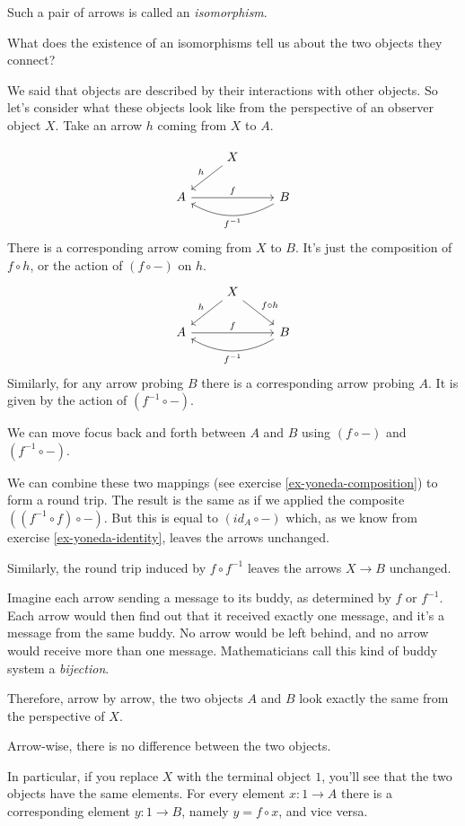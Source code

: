 \documentclass[DaoFP]{subfiles}
\begin{document}
Such a pair of arrows is called an \emph{isomorphism}.

What does the existence of an isomorphisms tell us about the two objects they connect? 

We said that objects are described by their interactions with other objects. So let's consider what these objects look like from the perspective of an observer object $X$. Take an arrow $h$ coming from $X$ to $A$.

\[
 \begin{tikzcd}
 & X
 \arrow[ld, "h"']
 \\
 A
 \arrow[rr, "f"]
  && B
 \arrow[ll, bend left,  "f^{-1}"]
 \end{tikzcd}
\]
There is a corresponding arrow coming from $X$ to $B$. It's just the composition of $f \circ h$, or the action of $(f \circ -)$ on $h$.
\[
 \begin{tikzcd}
 & X
 \arrow[ld, "h"']
 \arrow[rd, "f \circ h"]
 \\
 A
 \arrow[rr, "f"]
  && B
 \arrow[ll, bend left,  "f^{-1}"]
 \end{tikzcd}
\]
Similarly, for any arrow probing $B$ there is a corresponding arrow probing $A$. It is given by the action of  $(f^{-1} \circ -)$. 

We can move focus back and forth between $A$ and $B$ using $(f \circ -)$ and $(f^{-1} \circ -)$.

We can combine these two mappings (see exercise \ref{ex-yoneda-composition}) to form a round trip. The result is the same as if we applied the composite $((f^{-1} \circ f) \circ -)$. But this is equal to $(id_A \circ  -)$ which, as we know from exercise \ref{ex-yoneda-identity}, leaves the arrows unchanged.

Similarly, the round trip induced by $f \circ f^{-1}$ leaves the arrows $X \to B$ unchanged. 

Imagine each arrow sending a message to its buddy, as determined by $f$ or $f^{-1}$. Each arrow would then find out that it received exactly one message, and it's a message from the same buddy. No arrow would be left behind, and no arrow would receive more than one message. Mathematicians call this kind of buddy system a \emph{bijection}.

Therefore, arrow by arrow, the two objects $A$ and $B$ look exactly the same from the perspective of $X$. 

Arrow-wise, there is no difference between the two objects. 

In particular, if you replace $X$ with the terminal object $1$, you'll see that the two objects have the same elements. For every element $x \colon 1 \to A$ there is a corresponding element $y \colon 1 \to B$, namely $y = f \circ x$, and vice versa.
\end{document}
